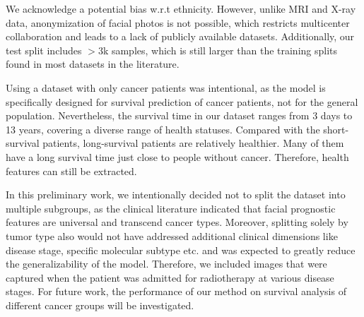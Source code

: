 \documentclass[runningheads]{llncs}
\begin{document}
We acknowledge a potential bias w.r.t ethnicity. However, unlike MRI and X-ray data, anonymization of facial photos is not possible, which restricts multicenter collaboration and leads to a lack of publicly available datasets. Additionally, our test split includes $>$3k samples, which is still larger than the training splits found in most datasets in the literature.

Using a dataset with only cancer patients was intentional, as the model is specifically designed for survival prediction of cancer patients, not for the general population. Nevertheless, the survival time in our dataset ranges from 3 days to 13 years, covering a diverse range of health statuses. Compared with the short-survival patients, long-survival patients are relatively healthier. Many of them have a long survival time just close to people without cancer. Therefore, health features can still be extracted.

In this preliminary work, we intentionally decided not to split the dataset into multiple subgroups, as the clinical literature indicated that facial prognostic features are universal and transcend cancer types. Moreover, splitting solely by tumor type also would not have addressed additional clinical dimensions like disease stage, specific molecular subtype etc. and was expected to greatly reduce the generalizability of the model. Therefore, we included images that were captured when the patient was admitted for radiotherapy at various disease stages. For future work, the performance of our method on survival analysis of different cancer groups will be investigated.
\end{document}
